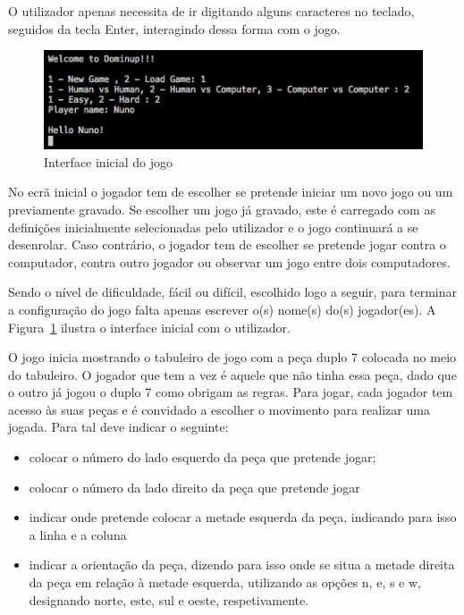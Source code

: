 \documentclass[a4paper]{article}
\begin{document}
O utilizador apenas necessita de ir digitando alguns caracteres no teclado, seguidos da tecla Enter, interagindo dessa forma com o jogo.

\begin{figure}[htbp]
\begin{center}
\includegraphics[scale=0.6]{input_ini.jpg}
\caption{Interface inicial do jogo}
\label{input_ini}
\end{center}
\end{figure}

No ecrã inicial o jogador tem de escolher se pretende iniciar um novo jogo ou um previamente gravado. Se escolher um jogo já gravado, este é carregado com as definições inicialmente selecionadas pelo utilizador e o jogo continuará a se desenrolar. Caso contrário, o jogador tem de escolher se pretende jogar contra o computador, contra outro jogador ou observar um jogo entre dois computadores. 

Sendo o nível de dificuldade, fácil ou difícil, escolhido logo a seguir, para terminar a configuração do jogo falta apenas escrever o(s) nome(s) do(s) jogador(es). A Figura~\ref{input_ini} ilustra o interface inicial com o utilizador.

O jogo inicia mostrando o tabuleiro de jogo com a peça duplo 7 colocada no meio do tabuleiro. O jogador que tem a vez é aquele que não tinha essa peça, dado que o outro já jogou o duplo 7 como obrigam as regras. Para jogar, cada jogador tem acesso às suas peças e é convidado a escolher o movimento para realizar uma jogada. Para tal deve indicar o seguinte:

\begin{itemize}
\item colocar o número do lado esquerdo da peça que pretende jogar;
\item colocar o número da lado direito da peça que pretende jogar
\item indicar onde pretende colocar a metade esquerda da peça, indicando para isso a linha e a coluna
\item indicar a orientação da peça, dizendo para isso onde se situa a metade direita da peça em relação à metade esquerda, utilizando as opções n, e, s e w, designando norte, este, sul e oeste, respetivamente.
\end{itemize}
\end{document}
